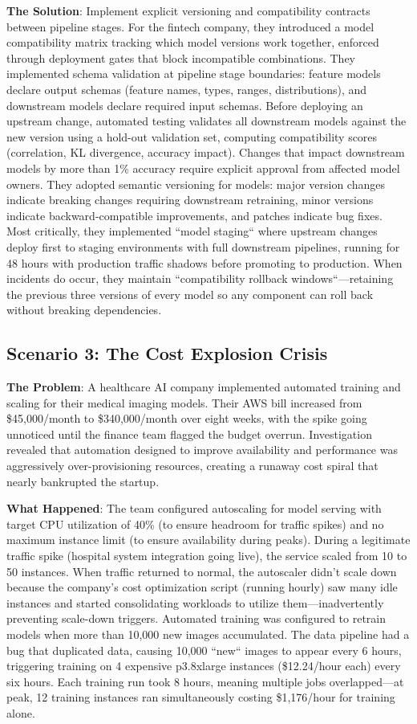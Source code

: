 \textbf{The Solution}: Implement explicit versioning and compatibility contracts between pipeline stages. For the fintech company, they introduced a model compatibility matrix tracking which model versions work together, enforced through deployment gates that block incompatible combinations. They implemented schema validation at pipeline stage boundaries: feature models declare output schemas (feature names, types, ranges, distributions), and downstream models declare required input schemas. Before deploying an upstream change, automated testing validates all downstream models against the new version using a hold-out validation set, computing compatibility scores (correlation, KL divergence, accuracy impact). Changes that impact downstream models by more than 1\% accuracy require explicit approval from affected model owners. They adopted semantic versioning for models: major version changes indicate breaking changes requiring downstream retraining, minor versions indicate backward-compatible improvements, and patches indicate bug fixes. Most critically, they implemented ``model staging`` where upstream changes deploy first to staging environments with full downstream pipelines, running for 48 hours with production traffic shadows before promoting to production. When incidents do occur, they maintain ``compatibility rollback windows``---retaining the previous three versions of every model so any component can roll back without breaking dependencies.

\subsection{Scenario 3: The Cost Explosion Crisis}

\textbf{The Problem}: A healthcare AI company implemented automated training and scaling for their medical imaging models. Their AWS bill increased from \$45,000/month to \$340,000/month over eight weeks, with the spike going unnoticed until the finance team flagged the budget overrun. Investigation revealed that automation designed to improve availability and performance was aggressively over-provisioning resources, creating a runaway cost spiral that nearly bankrupted the startup.

\textbf{What Happened}: The team configured autoscaling for model serving with target CPU utilization of 40\% (to ensure headroom for traffic spikes) and no maximum instance limit (to ensure availability during peaks). During a legitimate traffic spike (hospital system integration going live), the service scaled from 10 to 50 instances. When traffic returned to normal, the autoscaler didn't scale down because the company's cost optimization script (running hourly) saw many idle instances and started consolidating workloads to utilize them---inadvertently preventing scale-down triggers. Automated training was configured to retrain models when more than 10,000 new images accumulated. The data pipeline had a bug that duplicated data, causing 10,000 ``new`` images to appear every 6 hours, triggering training on 4 expensive p3.8xlarge instances (\$12.24/hour each) every six hours. Each training run took 8 hours, meaning multiple jobs overlapped---at peak, 12 training instances ran simultaneously costing \$1,176/hour for training alone.

